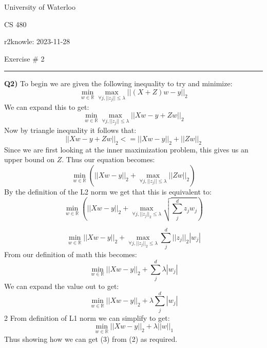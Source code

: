 \documentclass{article}
\begin{document}
\begin{titlepage}
	\setlength{\parindent}{0pt}
	\large

\vspace*{-2cm}



University of Waterloo \par
CS 480 \par
\vspace{0.05cm}
r2knowle: 2023-11-28
\vspace{0.2cm}

{\huge Exercise \# 2 \par}
\hrule

\vspace{0.5cm}
\textbf{Q2)} To begin we are given the following inequality to try and minimize:
\[ \min_{w \in \mathbb{R}} \max_{\forall j, ||z_j|| \leq \lambda} ||(X+Z)w - y ||_2 \]
We can expand this to get:
\[ \min_{w \in \mathbb{R}} \max_{\forall j, ||z_j|| \leq \lambda} ||Xw - y + Zw ||_2 \]
Now by triangle inequality it follows that:
\[ ||Xw - y + Zw ||_2 <=  ||Xw - y ||_2 + ||Zw ||_2 \]
Since we are first looking at the inner maximization problem, this gives us an upper bound on $Z$. Thus our equation becomes:
\[\min_{w \in \mathbb{R}} \left( ||Xw - y ||_2 + \max_{\forall j, ||z_j|| \leq \lambda} ||Zw ||_2  \right) \]
By the definition of the L2 norm we get that this is equivalent to:
\[\min_{w \in \mathbb{R}} \left( ||Xw - y ||_2 + \max_{\forall j, ||z_j||_2 \leq \lambda} \sqrt{\sum_j^d{z_jw_j}} \right) \]

\[\min_{w \in \mathbb{R}} ||Xw - y ||_2 +  \max_{\forall j, ||z_j||_2 \leq \lambda} \sum_j^d ||z_j||_2|w_j| \]
From our definition of math this becomes:
\[\min_{w \in \mathbb{R}} ||Xw - y ||_2 +  \sum_j^d \lambda|w_j| \]
We can expand the value out to get:
\[\min_{w \in \mathbb{R}} ||Xw - y ||_2 +  \lambda\sum_j^d |w_j| \]2
From definition of L1 norm we can simplify to get:
\[\min_{w \in \mathbb{R}} ||Xw - y ||_2 +  \lambda||w||_1 \]
Thus showing how we can get (3) from (2) as required.
\newpage
\end{titlepage}
\end{document}
